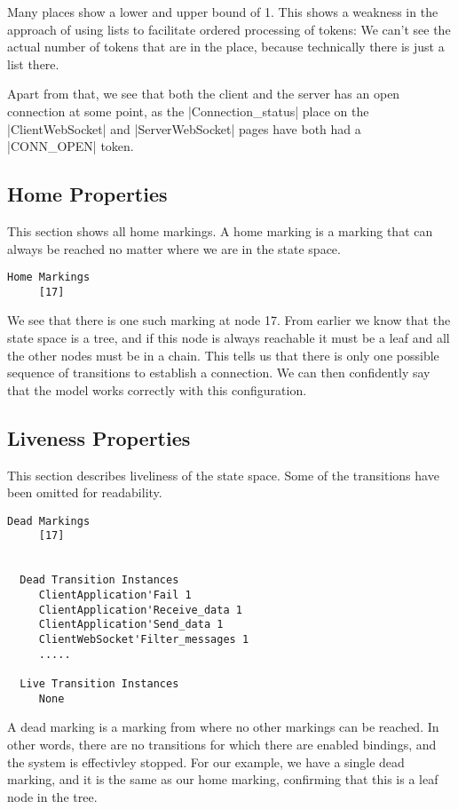	Many places show a lower and upper bound of 1. This shows a weakness
	in the approach of using lists to facilitate ordered processing of tokens: We
	can't see the actual number of tokens that are in the place, because
	technically there is just a list there. 
	
	Apart from that, we see that both the client and the server has an open
	connection at some point, as the |Connection_status| place on the
	|ClientWebSocket| and |ServerWebSocket| pages have both had a |CONN_OPEN|
	token.
	
	\subsection{Home Properties}
	This section shows all home markings. A home marking is a marking that can
	always be reached no matter where we are in the state space. 
	\begin{lstlisting}[language={}]
  Home Markings
     [17]
	\end{lstlisting}
	We see that there is one such marking at node 17. From earlier we know that the
	state space is a tree, and if this node is always reachable it must be a leaf
	and all the other nodes must be in a chain. This tells us that there is only
	one possible sequence of transitions to establish a connection. We can then
	confidently say that the model works correctly with this configuration.
	
	\subsection{Liveness Properties}
	This section describes liveliness of the state space. Some of the transitions
	have been omitted for readability.
	
	\begin{lstlisting}[language={}]
  Dead Markings
     [17]


  Dead Transition Instances
     ClientApplication'Fail 1
     ClientApplication'Receive_data 1
     ClientApplication'Send_data 1
     ClientWebSocket'Filter_messages 1
     .....

  Live Transition Instances
     None
	\end{lstlisting}
	
	A dead marking is a marking from where no other markings can be reached.
	 In other words, there are no transitions
	for which there are enabled bindings, and the system is effectivley stopped.
	For our example, we have a single dead marking, and it is the same as our home
	marking, confirming that this is a leaf node in the tree.
	
